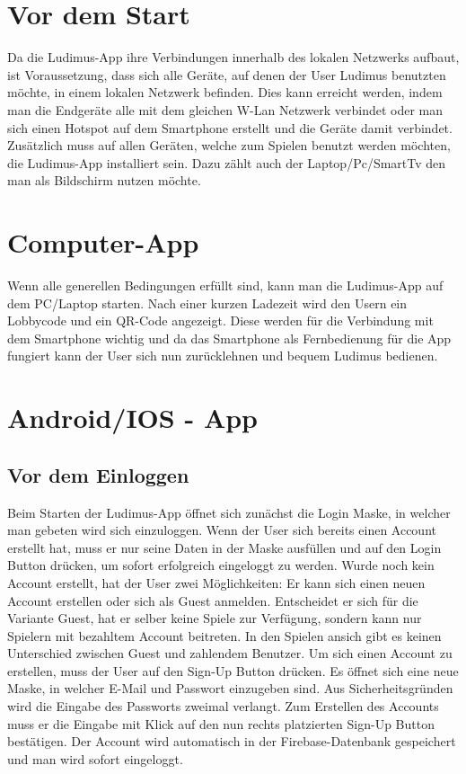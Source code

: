 \section{Vor dem Start}
Da die Ludimus-App ihre Verbindungen innerhalb des lokalen Netzwerks aufbaut, ist Voraussetzung, dass sich alle Geräte, auf denen der User Ludimus benutzten möchte, in einem lokalen Netzwerk befinden. Dies kann erreicht werden, indem man die Endgeräte alle mit dem gleichen W-Lan Netzwerk verbindet oder man sich einen Hotspot auf dem Smartphone erstellt und die Geräte damit verbindet. Zusätzlich muss auf allen Geräten, welche zum Spielen benutzt werden möchten, die Ludimus-App installiert sein. Dazu zählt auch der Laptop/Pc/SmartTv den man als Bildschirm nutzen möchte.
\section{Computer-App}
Wenn alle generellen Bedingungen erfüllt sind, kann man die Ludimus-App auf dem PC/Laptop starten. Nach einer kurzen Ladezeit wird den Usern ein Lobbycode und ein QR-Code angezeigt. Diese werden für die Verbindung mit dem Smartphone wichtig und da das Smartphone als Fernbedienung für die App fungiert kann der User sich nun zurücklehnen und bequem Ludimus bedienen.
\section{Android/IOS - App}
\subsection{Vor dem Einloggen}
Beim Starten der Ludimus-App öffnet sich zunächst die Login Maske, in welcher man gebeten wird sich einzuloggen. Wenn der User sich bereits einen Account erstellt hat, muss er nur seine Daten in der Maske ausfüllen und auf den Login Button drücken, um sofort erfolgreich eingeloggt zu werden. Wurde noch kein Account erstellt, hat der User zwei Möglichkeiten: Er kann sich einen neuen Account erstellen oder sich als Guest anmelden. Entscheidet er sich für die Variante Guest, hat er selber keine Spiele zur Verfügung, sondern kann nur Spielern mit bezahltem Account beitreten. In den Spielen ansich gibt es keinen Unterschied zwischen Guest und zahlendem Benutzer. Um sich einen Account zu erstellen, muss der User auf den Sign-Up Button drücken. Es öffnet sich eine neue Maske, in welcher E-Mail und Passwort einzugeben sind. Aus Sicherheitsgründen wird die Eingabe des Passworts zweimal verlangt. Zum Erstellen des Accounts muss er die Eingabe mit Klick auf den nun rechts platzierten Sign-Up Button bestätigen. Der Account wird automatisch in der Firebase-Datenbank gespeichert und man wird sofort eingeloggt.

